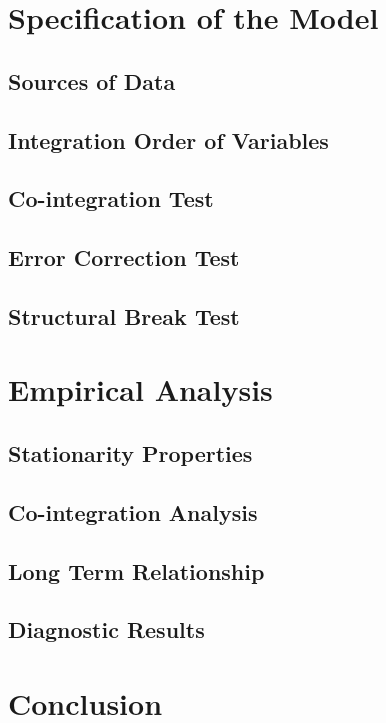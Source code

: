 \documentclass[11pt,a4paper]{article}
\begin{document}
\section{Specification of the Model}

\subsection{Sources of Data}

\subsection{Integration Order of Variables}

\subsection{Co-integration Test}

\subsection{Error Correction Test}

\subsection{Structural Break Test }

\section{Empirical Analysis}

\subsection{Stationarity Properties}

\subsection{Co-integration Analysis}

\subsection{Long Term Relationship}

\subsection{Diagnostic Results}

\section{Conclusion}
\end{document}
